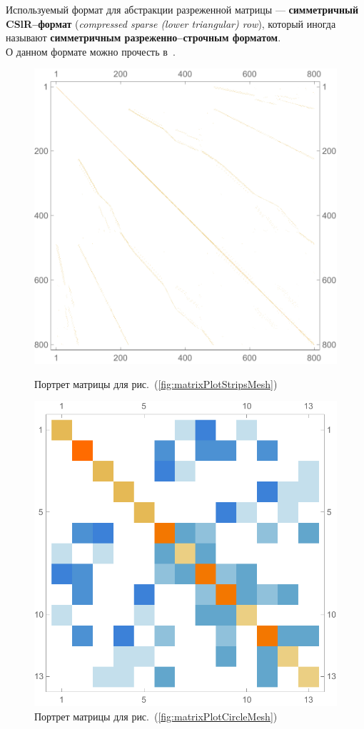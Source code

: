 Используемый формат для абстракции разреженной матрицы --- \textbf{симметричный CSlR--формат} (\textit{compressed sparse (lower triangular) row}), который иногда называют \textbf{симметричным разреженно--строчным форматом}.\\
О данном формате можно прочесть в~\cite[с.~5]{sparskit}.

\begin{figure}[!hb]
	\includegraphics[width=\linewidth]{img/matrixPlotStrips.pdf}
	\caption{Портрет матрицы для рис.~(\ref{fig:matrixPlotStripsMesh})}\label{fig:matrixPlotStrips.pdf}
	\endminipage\hfill
	\includegraphics[width=\linewidth]{img/matrixPlotCircle.pdf}
	\caption{Портрет матрицы для рис.~(\ref{fig:matrixPlotCircleMesh})}\label{fig:matrixPlotCircle}
	\endminipage
\end{figure}

